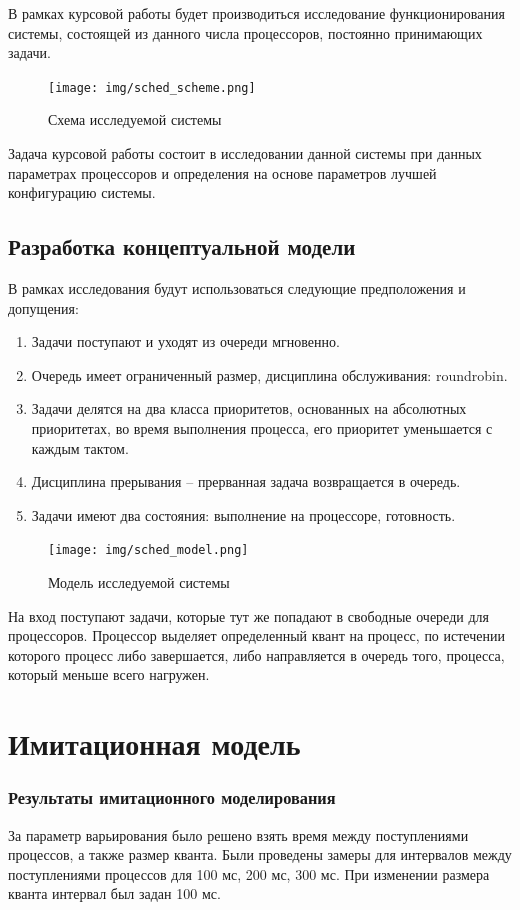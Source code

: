 В рамках курсовой работы будет производиться исследование функционирования
системы, состоящей из данного числа процессоров, постоянно принимающих задачи.
\begin{figure}[h]
\centering
\texttt{[image: img/sched\_scheme.png]}
\caption{Схема исследуемой системы}
\end{figure}

Задача курсовой работы состоит в исследовании данной системы при данных параметрах
процессоров и определения на основе параметров лучшей конфигурацию системы.

\subsection{Разработка концептуальной модели}
В рамках исследования будут использоваться следующие предположения и допущения:
\begin{enumerate}
\item Задачи поступают и уходят из очереди мгновенно.
\item Очередь имеет ограниченный размер, дисциплина обслуживания: roundrobin.
\item Задачи делятся на два класса приоритетов, основанных на абсолютных
приоритетах, во время выполнения процесса, его приоритет уменьшается с каждым
тактом.
\item Дисциплина прерывания -- прерванная задача возвращается в очередь.
\item Задачи имеют два состояния: выполнение на процессоре, готовность.
\end{enumerate}
\begin{figure}[h]
\centering
\texttt{[image: img/sched\_model.png]}
\caption{Модель исследуемой системы}
\end{figure}

На вход поступают задачи, которые тут же попадают в свободные очереди для
процессоров. Процессор выделяет определенный квант на процесс, по истечении
которого процесс либо завершается, либо направляется в очередь того, процесса,
который меньше всего нагружен.

\section{Имитационная модель}
\subsubsection{Результаты имитационного моделирования}
За параметр варьирования было решено взять время между поступлениями процессов,
а также размер кванта.
Были проведены замеры для интервалов между поступлениями процессов для 100 мс,
200 мс, 300 мс.
При изменении размера кванта интервал был задан 100 мс.


